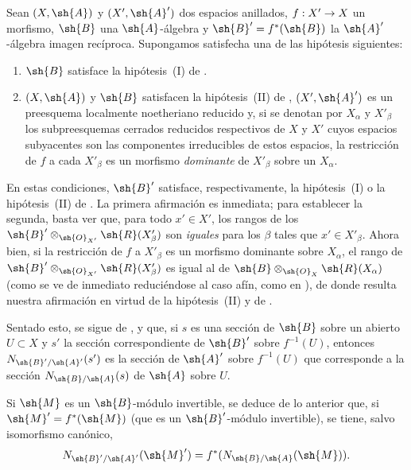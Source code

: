 \documentclass[oneside,10pt]{amsart}
\makeatletter
\newcommand{\ega@arrow}[2]{\mathchoice{#1}{#2}{#2}{#2}}
\renewcommand{\to}{\ega@arrow{\longrightarrow}{\rightarrow}}
\newcommand{\oldpage}[2][]{\marginnote{\normalfont\footnotesize\textbf{#1}~|~#2}\ignorespaces}
\let\EGAOriginalLabel\label
\renewcommand{\label}[1]{\phantomsection\EGAOriginalLabel{#1}}
\makeatother
\begin{document}
\begin{env}[6.5.4]
\label{II.6.5.4}
Sean $(X,\sh{A})$ y $(X',\sh{A}')$ dos espacios anillados, $f:X'\to X$ un morfismo, $\sh{B}$ una $\sh{A}$-álgebra y $\sh{B}'=f^*(\sh{B})$ la $\sh{A}'$-álgebra imagen recíproca.
Supongamos satisfecha una de las hipótesis siguientes:
\begin{enumerate}
  \item $\sh{B}$ satisface la hipótesis~(I) de .
  \item $(X,\sh{A})$ y $\sh{B}$ satisfacen la hipótesis~(II) de , $(X',\sh{A}')$ es un preesquema localmente noetheriano reducido y, si se denotan por $X_\alpha$ y $X'_\beta$ los subpreesquemas cerrados reducidos respectivos de $X$ y $X'$ cuyos espacios subyacentes son las componentes irreducibles de estos espacios, la restricción de $f$ a cada $X'_\beta$ es un morfismo \emph{dominante} de $X'_\beta$ sobre un $X_\alpha$.
\end{enumerate}

En estas condiciones, $\sh{B}'$ satisface, respectivamente, la hipótesis~(I) o la hipótesis~(II) de .
La primera afirmación es inmediata;
para establecer la segunda, basta ver que, para todo $x'\in X'$, los rangos de los $\sh{B}'\otimes_{\sh{O}_{X'}}\sh{R}(X'_\beta)$ son \emph{iguales} para los $\beta$ tales que $x'\in X'_\beta$.
Ahora bien, si la restricción de $f$ a $X'_\beta$ es un morfismo dominante sobre $X_\alpha$, el rango de $\sh{B}'\otimes_{\sh{O}_{X'}}\sh{R}(X'_\beta)$ es igual al de $\sh{B}\otimes_{\sh{O}_X}\sh{R}(X_\alpha)$ (como se ve de inmediato reduciéndose al caso afín, como en ), de donde resulta nuestra afirmación en virtud de la hipótesis~(II) y de .

\oldpage[II]{129}
Sentado esto, se sigue de ,  y  que, si $s$ es una sección de $\sh{B}$ sobre un abierto $U\subset X$ y $s'$ la sección correspondiente de $\sh{B}'$ sobre $f^{-1}(U)$, entonces $N_{\sh{B}'/\sh{A}'}(s')$ es la sección de $\sh{A}'$ sobre $f^{-1}(U)$ que corresponde a la sección $N_{\sh{B}/\sh{A}}(s)$ de $\sh{A}$ sobre $U$.

Si $\sh{M}$ es un $\sh{B}$-módulo invertible, se deduce de lo anterior que, si $\sh{M}'=f^*(\sh{M})$ (que es un $\sh{B}'$-módulo invertible), se tiene, salvo isomorfismo canónico,
\[
  N_{\sh{B}'/\sh{A}'}(\sh{M}')=f^*(N_{\sh{B}/\sh{A}}(\sh{M})).
\]
\end{env}

\end{document}

